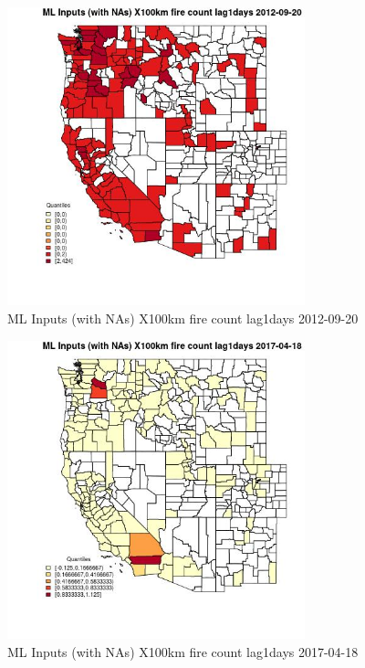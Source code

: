 \clearpage 

\begin{figure} 
\centering  
\includegraphics[width=0.77\textwidth]{Code_Outputs/Report_ML_input_PM25_Step4_part_e_de_duplicated_aves_compiled_2019-05-14wNAs_CountyX100km_fire_count_lag1daysMean2012-09-20_2012-09-20.jpg} 
\caption{\label{fig:Report_ML_input_PM25_Step4_part_e_de_duplicated_aves_compiled_2019-05-14wNAsCountyX100km_fire_count_lag1daysMean2012-09-20_2012-09-20}ML Inputs (with NAs) X100km fire count lag1days 2012-09-20} 
\end{figure} 
 

\begin{figure} 
\centering  
\includegraphics[width=0.77\textwidth]{Code_Outputs/Report_ML_input_PM25_Step4_part_e_de_duplicated_aves_compiled_2019-05-14wNAs_CountyX100km_fire_count_lag1daysMean2017-04-18_2017-04-18.jpg} 
\caption{\label{fig:Report_ML_input_PM25_Step4_part_e_de_duplicated_aves_compiled_2019-05-14wNAsCountyX100km_fire_count_lag1daysMean2017-04-18_2017-04-18}ML Inputs (with NAs) X100km fire count lag1days 2017-04-18} 
\end{figure} 
 

